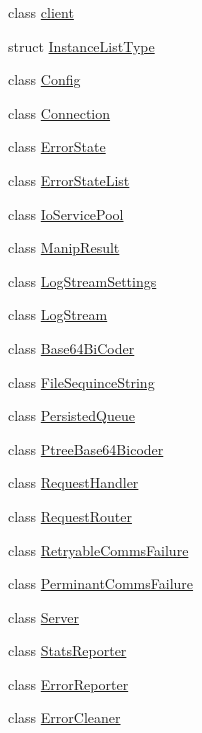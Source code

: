 \begin{DoxyCompactItemize}
\item 
class \hyperlink{classkisscpp_1_1client}{client}
\item 
struct \hyperlink{structkisscpp_1_1_instance_list_type}{Instance\-List\-Type}
\item 
class \hyperlink{classkisscpp_1_1_config}{Config}
\item 
class \hyperlink{classkisscpp_1_1_connection}{Connection}
\item 
class \hyperlink{classkisscpp_1_1_error_state}{Error\-State}
\item 
class \hyperlink{classkisscpp_1_1_error_state_list}{Error\-State\-List}
\item 
class \hyperlink{classkisscpp_1_1_io_service_pool}{Io\-Service\-Pool}
\item 
class \hyperlink{classkisscpp_1_1_manip_result}{Manip\-Result}
\item 
class \hyperlink{classkisscpp_1_1_log_stream_settings}{Log\-Stream\-Settings}
\item 
class \hyperlink{classkisscpp_1_1_log_stream}{Log\-Stream}
\item 
class \hyperlink{classkisscpp_1_1_base64_bi_coder}{Base64\-Bi\-Coder}
\item 
class \hyperlink{classkisscpp_1_1_file_sequince_string}{File\-Sequince\-String}
\item 
class \hyperlink{classkisscpp_1_1_persisted_queue}{Persisted\-Queue}
\item 
class \hyperlink{classkisscpp_1_1_ptree_base64_bicoder}{Ptree\-Base64\-Bicoder}
\item 
class \hyperlink{classkisscpp_1_1_request_handler}{Request\-Handler}
\item 
class \hyperlink{classkisscpp_1_1_request_router}{Request\-Router}
\item 
class \hyperlink{classkisscpp_1_1_retryable_comms_failure}{Retryable\-Comms\-Failure}
\item 
class \hyperlink{classkisscpp_1_1_perminant_comms_failure}{Perminant\-Comms\-Failure}
\item 
class \hyperlink{classkisscpp_1_1_server}{Server}
\item 
class \hyperlink{classkisscpp_1_1_stats_reporter}{Stats\-Reporter}
\item 
class \hyperlink{classkisscpp_1_1_error_reporter}{Error\-Reporter}
\item 
class \hyperlink{classkisscpp_1_1_error_cleaner}{Error\-Cleaner}
\item 

\end{DoxyCompactItemize}
